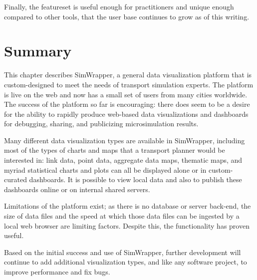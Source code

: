Finally, the featureset is useful enough for practitioners and unique enough compared to other tools, that the user base continues to grow as of this writing.


\hypertarget{simwrapper-summary}{%
\section{Summary}\label{simwrapper-summary}}

This chapter describes SimWrapper, a general data visualization platform that is custom-designed to meet the needs of transport simulation experts. The platform is live on the web and now has a small set of users from many cities worldwide. The success of the platform so far is  encouraging: there does seem to be a desire for the ability to rapidly produce web-based data visualizations and dashboards for debugging, sharing, and publicizing microsimulation results.

Many different data visualization types are available in SimWrapper, including most of the types of charts and maps that a transport planner would be interested in: link data, point data, aggregate data maps, thematic maps, and myriad statistical charts and plots can all be displayed alone or in custom-curated dashboards. It is possible to view local data and also to publish these dashboards online or on internal shared servers.

Limitations of the platform exist; as there is no database or server back-end, the size of data files and the speed at which those data files can be ingested by a local web browser are limiting factors. Despite this, the functionality has proven useful.

Based on the initial success and use of SimWrapper, further development will continue to add additional visualization types, and like any software project, to improve performance and fix bugs.
